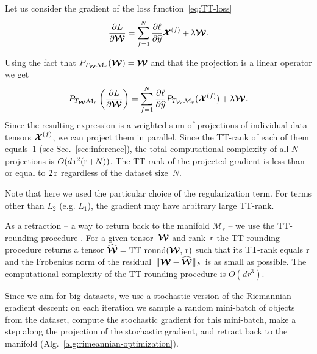 Let us consider the gradient of the loss function~\eqref{eq:TT-loss}
\begin{equation}
\label{eq:TT-gradient}
\frac{\partial L}{\partial \boldsymbol{\mathcal{W}}} = \sum_{f=1}^N \frac{\partial \ell}{\partial \widehat{y}} \boldsymbol{\mathcal{X}}^{(f)} + \uplambda \boldsymbol{\mathcal{W}}.
\end{equation}

Using the fact that $P_{T_{\boldsymbol{\mathcal{W}}} \mathcal{M}_r}(\boldsymbol{\mathcal{W}}) = \boldsymbol{\mathcal{W}}$ and that the projection is a linear operator we get
\begin{equation}
\label{eq:riemannian-gradient}
P_{T_{\boldsymbol{\mathcal{W}}} \mathcal{M}_r}\left ( \frac{\partial L}{\partial \boldsymbol{\mathcal{W}}} \right) = \sum_{f=1}^N \frac{\partial \ell}{\partial \widehat{y}} P_{T_{\boldsymbol{\mathcal{W}}} \mathcal{M}_r}(\boldsymbol{\mathcal{X}}^{(f)}) + \uplambda \boldsymbol{\mathcal{W}}.
\end{equation}
Since the resulting expression is a weighted sum of projections of individual data tensors $\boldsymbol{\mathcal{X}}^{(f)}$, we can project them in parallel.
Since the TT-rank of each of them equals~$1$ (see Sec.~\ref{sec:inference}), the total computational complexity of all $N$ projections is $O(d \operatorname{r}^2 (\operatorname{r} + N))$.
The TT-rank of the projected gradient is less than or equal to $2 \operatorname{r}$ regardless of the dataset size~$N$.

Note that here we used the particular choice of the regularization term. For terms other than $L_2$ (e.g. $L_1$), the gradient may have arbitrary large TT-rank.

As a retraction -- a way to return back to the manifold $\mathcal{M}_r$ -- we use the TT-rounding procedure \cite{oseledets2011ttMain}. For a given tensor~$\boldsymbol{\mathcal{W}}$ and rank~$\operatorname{r}$ the TT-rounding procedure returns a tensor $\widehat{\boldsymbol{\mathcal{W}}} = \operatorname{TT-round}(\boldsymbol{\mathcal{W}},\,\operatorname{r})$ such that its TT-rank equals $\operatorname{r}$ and the Frobenius norm of the residual~$\| \boldsymbol{\mathcal{W}} - \widehat{\boldsymbol{\mathcal{W}}}\|_F$ is as small as possible.
The computational complexity of the TT-rounding procedure is $O(dr^3)$.

Since we aim for big datasets, we use a stochastic version of the Riemannian gradient descent: on each iteration we sample a random mini-batch of objects from the dataset, compute the stochastic gradient for this mini-batch, make a step along the projection of the stochastic gradient, and retract back to the manifold (Alg.~\ref{alg:rimeannian-optimization}).

